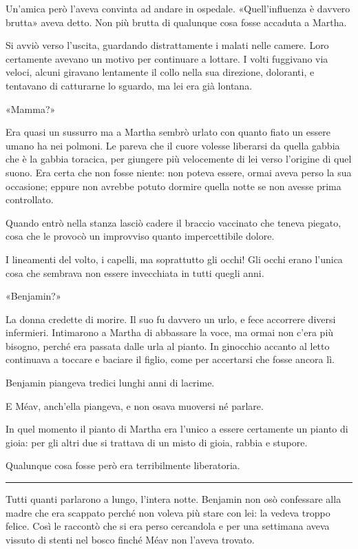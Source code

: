 \documentclass[a4paper,10pt]{memoir}
\begin{document}
Un’amica però l’aveva convinta ad andare in ospedale. «Quell’influenza è davvero brutta» aveva detto. Non più brutta di
qualunque cosa fosse accaduta a Martha.

Si avviò verso l’uscita, guardando distrattamente i malati nelle camere. Loro certamente avevano un motivo per
continuare a lottare. I volti fuggivano via veloci, alcuni giravano lentamente il collo nella sua direzione, doloranti,
e tentavano di catturarne lo sguardo, ma lei era già lontana.

«Mamma?»

Era quasi un sussurro ma a Martha sembrò urlato con quanto fiato un essere umano ha nei polmoni. Le pareva che il cuore
volesse liberarsi da quella gabbia che è la gabbia toracica, per giungere più velocemente di lei verso l’origine di quel
suono. Era certa che non fosse niente: non poteva essere, ormai aveva perso la sua occasione; eppure non avrebbe potuto
dormire quella notte se non avesse prima controllato.

Quando entrò nella stanza lasciò cadere il braccio vaccinato che teneva piegato, cosa che le provocò un improvviso
quanto impercettibile dolore.

I lineamenti del volto, i capelli, ma soprattutto gli occhi! Gli occhi erano l’unica cosa che sembrava non essere
invecchiata in tutti quegli anni.

«Benjamin?»

La donna credette di morire. Il suo fu davvero un urlo, e fece accorrere diversi infermieri. Intimarono a Martha di
abbassare la voce, ma ormai non c’era più bisogno, perché era passata dalle urla al pianto. In ginocchio accanto al
letto continuava a toccare e baciare il figlio, come per accertarsi che fosse ancora lì.

Benjamin piangeva tredici lunghi anni di lacrime.

E Méav, anch’ella piangeva, e non osava muoversi né parlare.

In quel momento il pianto di Martha era l’unico a essere certamente un pianto di gioia: per gli altri due si trattava di
un misto di gioia, rabbia e stupore.

Qualunque cosa fosse però era terribilmente liberatoria.

\plainbreak{1}

Tutti quanti parlarono a lungo, l’intera notte. Benjamin non osò confessare alla madre che era scappato perché non
voleva più stare con lei: la vedeva troppo felice. Così le raccontò che si era perso cercandola e per una settimana
aveva vissuto di stenti nel bosco finché Méav non l’aveva trovato.
\end{document}
